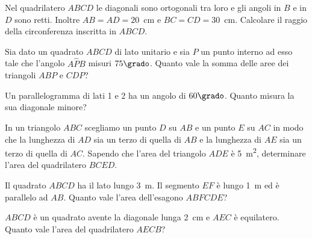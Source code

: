 \begin{multicols}{2}
\begin{esercizio}
\label{ese:7.99}
Nel quadrilatero \(ABCD\) le diagonali sono ortogonali tra loro e gli 
angoli in \(B\) e in \(D\) sono retti. Inoltre \(AB=AD=20\)~cm e 
\(BC=CD=30\)~cm. Calcolare il raggio della circonferenza inscritta in 
\(ABCD\).
\end{esercizio}

\begin{esercizio}
\label{ese:7.100}
Sia dato un quadrato \(ABCD\) di lato unitario e sia \(P\) un punto 
interno ad esso tale che l'angolo \(A\widehat{P}B\) misuri \(75\grado\). 
Quanto vale la somma delle aree dei triangoli \(ABP\) e \(CDP\)? 
\end{esercizio}

\begin{esercizio}
\label{ese:7.101}
Un parallelogramma di lati 1 e 2 ha un angolo di \(60\grado\). Quanto 
misura la sua diagonale minore?   
\end{esercizio}

\begin{esercizio}
\label{ese:7.102}
In un triangolo \(ABC\) scegliamo un punto \(D\) su \(AB\) e un punto \(E\) 
su \(AC\) in modo che la lunghezza di \(AD\) sia un terzo di quella di 
\(AB\) e la lunghezza di \(AE\) sia un terzo di quella di \(AC\). Sapendo 
che l'area del triangolo \(ADE\) è 5~m\textsuperscript{2}, determinare 
l'area del quadrilatero \(BCED\).
\end{esercizio}

\begin{esercizio}
\label{ese:7.103}
Il quadrato \(ABCD\) ha il lato lungo 3~m. Il segmento \(EF\) è lungo 1~m 
ed è parallelo ad \(AB\). Quanto vale l'area dell'esagono \(ABFCDE\)?
\end{esercizio}

%

\begin{esercizio}
\label{ese:7.104}
\(ABCD\) è un quadrato avente la diagonale lunga 2~cm e \(AEC\) è 
equilatero. Quanto vale l'area del quadrilatero \(AECB\)?
\end{esercizio}


\end{multicols}
